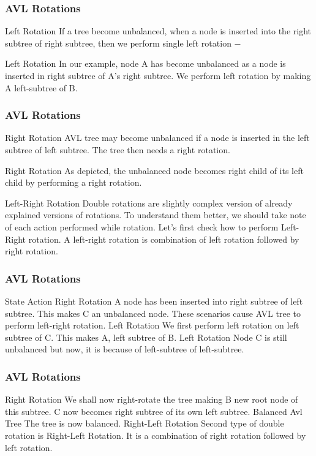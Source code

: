 \documentclass{beamer}
\begin{document}
\begin{frame}
\frametitle{AVL Rotations}
\large

Left Rotation
If a tree become unbalanced, when a node is inserted into the right subtree of right subtree, then we perform single left rotation −

Left Rotation
In our example, node A has become unbalanced as a node is inserted in right subtree of A's right subtree. We perform left rotation by making A left-subtree of B.
\end{frame}
\begin{frame}
\frametitle{AVL Rotations}
\large

Right Rotation
AVL tree may become unbalanced if a node is inserted in the left subtree of left subtree. The tree then needs a right rotation.

Right Rotation
As depicted, the unbalanced node becomes right child of its left child by performing a right rotation.

Left-Right Rotation
Double rotations are slightly complex version of already explained versions of rotations. To understand them better, we should take note of each action performed while rotation. Let's first check how to perform Left-Right rotation. A left-right rotation is combination of left rotation followed by right rotation.
\end{frame}
\begin{frame}
\frametitle{AVL Rotations}
\large

State	Action
Right Rotation	A node has been inserted into right subtree of left subtree. This makes C an unbalanced node. These scenarios cause AVL tree to perform left-right rotation.
Left Rotation	We first perform left rotation on left subtree of C. This makes A, left subtree of B.
Left Rotation	Node C is still unbalanced but now, it is because of left-subtree of left-subtree.
\end{frame}
\begin{frame}
\frametitle{AVL Rotations}
\large

Right Rotation	We shall now right-rotate the tree making B new root node of this subtree. C now becomes right subtree of its own left subtree.
Balanced Avl Tree	The tree is now balanced.
Right-Left Rotation
Second type of double rotation is Right-Left Rotation. It is a combination of right rotation followed by left rotation.
\end{frame}
\end{document}
